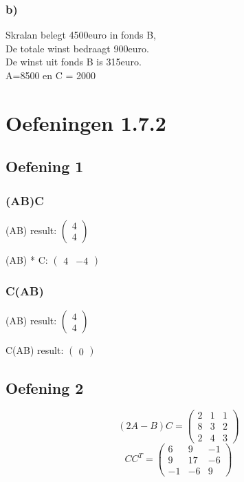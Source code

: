 \documentclass[lineaire_algebra_oplossingen.tex]{subfiles}
\begin{document}
\subsubsection*{b)}
Skralan belegt 4500euro in fonds B, \\
De totale winst bedraagt 900euro. \\
De winst uit fonds B is 315euro. \\
A=8500 en C = 2000


\section{Oefeningen 1.7.2}
\subsection{Oefening 1}
\subsubsection*{(AB)C}
(AB) result:
$
\begin{pmatrix}

4\\
4

\end{pmatrix}
$

(AB) * C:
$
\begin{pmatrix}
4 & -4
\end{pmatrix}
$

\subsubsection*{C(AB)}
(AB) result:
$
\begin{pmatrix}
4\\
4
\end{pmatrix}
$

C(AB) result:
$
\begin{pmatrix}
0
\end{pmatrix}
$

\subsection{Oefening 2}
\[(2A-B)C = 
\begin{pmatrix}
2 &  1 &  1\\
8 &  3 &  2\\
2 &  4 &  3
\end{pmatrix}
\]
\[ CC^T =
\begin{pmatrix}
6 &  9 &  -1\\
9 &  17 &  -6\\
-1 &  -6 &  9
\end{pmatrix}
\]
\end{document}
